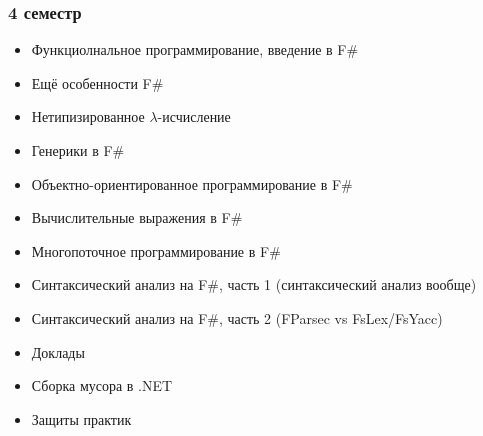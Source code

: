 \documentclass[xetex,mathserif,serif]{beamer}
\begin{document}
    \begin{frame}
        \frametitle{4 семестр}
        \begin{scriptsize}
            \begin{itemize}
                \item Функциолнальное программирование, введение в F\#
                \item Ещё особенности F\#
                \item Нетипизированное $\lambda$-исчисление
                \item Генерики в F\#
                \item Объектно-ориентированное программирование в F\#
                \item Вычислительные выражения в F\#
                \item Многопоточное программирование в F\#
                \item Синтаксический анализ на F\#, часть 1 (синтаксический анализ вообще)
                \item Синтаксический анализ на F\#, часть 2 (FParsec vs FsLex/FsYacc)
                \item Доклады
                \item Сборка мусора в .NET
                \item Защиты практик
            \end{itemize}
        \end{scriptsize}
    \end{frame}
\end{document}
